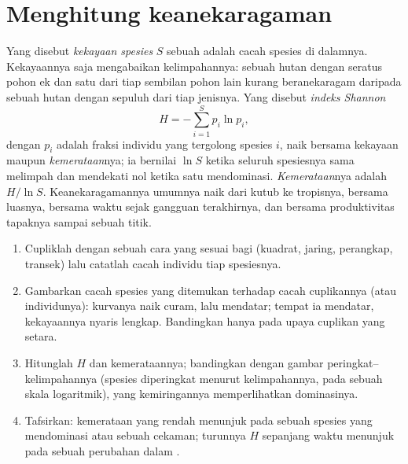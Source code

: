 \section{Menghitung keanekaragaman}

\begin{definition}\label{def:b1:ecosystem-organization:diversity}
Yang disebut \emph{kekayaan spesies} $S$ sebuah  adalah cacah
spesies di dalamnya. Kekayaannya saja mengabaikan kelimpahannya:
sebuah hutan dengan seratus pohon ek dan satu dari tiap sembilan pohon
lain kurang beranekaragam daripada sebuah hutan dengan sepuluh dari
tiap jenisnya. Yang disebut \emph{indeks Shannon}
\[
H = -\sum_{i=1}^{S} p_i \ln p_i ,
\]
dengan $p_i$ adalah fraksi individu yang tergolong spesies $i$, naik
bersama kekayaan maupun \emph{kemerataan}nya; ia bernilai $\ln S$
ketika seluruh spesiesnya sama melimpah dan mendekati nol ketika satu
mendominasi. \emph{Kemerataan}nya adalah $H/\ln S$. Keanekaragamannya
umumnya naik dari kutub ke tropisnya, bersama luasnya, bersama waktu
sejak gangguan terakhirnya, dan bersama produktivitas tapaknya sampai
sebuah titik.
\end{definition}

\begin{method}\label{met:b1:ecosystem-organization:sampling}
\begin{enumerate}
  \item Cupliklah dengan sebuah cara yang sesuai bagi 
        (kuadrat, jaring, perangkap, transek) lalu catatlah cacah
        individu tiap spesiesnya.
  \item Gambarkan cacah spesies yang ditemukan terhadap cacah
        cuplikannya (atau individunya): kurvanya naik curam, lalu
        mendatar; tempat ia mendatar, kekayaannya nyaris lengkap.
        Bandingkan  hanya pada upaya cuplikan yang setara.
  \item Hitunglah $H$ dan kemerataannya; bandingkan dengan gambar
        peringkat--kelimpahannya (spesies diperingkat menurut
        kelimpahannya, pada sebuah skala logaritmik), yang
        kemiringannya memperlihatkan dominasinya.
  \item Tafsirkan: kemerataan yang rendah menunjuk pada sebuah spesies
        yang mendominasi atau sebuah cekaman; turunnya $H$ sepanjang
        waktu menunjuk pada sebuah perubahan dalam .
\end{enumerate}
\end{method}

